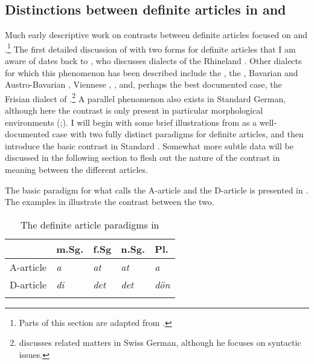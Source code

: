 \documentclass[output=paper
,modfonts
,nonflat]{langscibook}
\begin{document}
\subsection{Distinctions between definite
  articles in  and }

Much early descriptive work on contrasts between definite articles focused on  and .\footnote{Parts of this section are adapted from \citet{Schwarz2013}.} The first
detailed discussion of  with two forms for definite articles that I am aware of dates back to
\citet{Heinrichs1954}, who discusses dialects of the Rhineland
\citep[see also][]{Hartmann1967}. Other dialects for which this
phenomenon has been described include 
the 
\citep{Hartmann1982}, 
the  \citep{Himmelmann1997},
Bavarian \citep{Scheutz1988,Schwager2007} 
and Austro-Bavarian \citep{BruggerPrinzhorn1996,Wiltschko2013},
Viennese \citep{SchusterSchikola1984},
 \citep{Schmitt2006},
and, perhaps the best
documented case, the Frisian dialect of 
\citep{Ebert1971,Ebert1971b}.\footnote{\citet{Leu2008} discusses
  related matters in Swiss German, although he focuses
  on syntactic issues.}  A parallel phenomenon also exists in
Standard German, although here the contrast is only present in
particular morphological environments
(\citealt{Hartmann1978,Hartmann1980,Haberland1985,Cieschinger2006,Waldmuller2008};\linebreak \citealt{Schwarz2009}). I
will begin with some brief illustrations from  as a
well-documented case with two fully distinct paradigms for definite
articles, and then introduce the basic contrast in Standard
. Somewhat more subtle  data will be discussed in the
following section to flesh out the nature of the contrast in meaning
between the different articles.

The basic paradigm for what \citet{Ebert1971b} calls the A-article and
the D-article is presented in . The
examples in  illustrate the contrast between the two.

\begin{table}[h]
	\begin{tabularx}{.5\textwidth}{lXXXX} 
		\lsptoprule
		& {m.Sg.} & {f.Sg} & {n.Sg.} & {Pl}.\\
		\midrule
		{A-article} & \textit{a} & \textit{at} & \textit{at} & \textit{a}\\
		{D-article} & \textit{di} & \textit{det} & \textit{det} & \textit{d\"on}\\
		\lspbottomrule
	\end{tabularx}
	\caption{The definite article paradigms in  \citep[159]{Ebert1971b}}
	\label{tab:schwarz:1}
\end{table}
\end{document}
